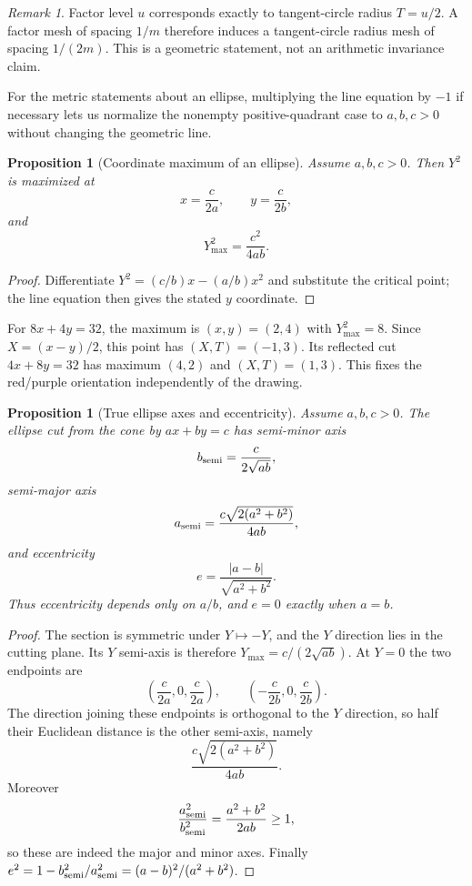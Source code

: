 \documentclass[11pt]{amsart}
\newtheorem{proposition}[theorem]{Proposition}
\theoremstyle{remark}
\newtheorem*{remark}{Remark}
\begin{document}
\begin{remark}
Factor level $u$ corresponds exactly to tangent-circle radius $T=u/2$. A factor mesh of spacing $1/m$ therefore induces a tangent-circle radius mesh of spacing $1/(2m)$. This is a geometric statement, not an arithmetic invariance claim.
\end{remark}

For the metric statements about an ellipse, multiplying the line equation by $-1$ if necessary lets us normalize the nonempty positive-quadrant case to $a,b,c>0$ without changing the geometric line.

\begin{proposition}[Coordinate maximum of an ellipse]\label{prop:semiaxes}
Assume $a,b,c>0$. Then $Y^2$ is maximized at
\[
x=\frac{c}{2a},\qquad y=\frac{c}{2b},
\]
and
\[
Y_{\max}^2=\frac{c^2}{4ab}.
\]
\end{proposition}
\begin{proof}
Differentiate $Y^2=(c/b)x-(a/b)x^2$ and substitute the critical point; the line equation then gives the stated $y$ coordinate.
\end{proof}

For $8x+4y=32$, the maximum is $(x,y)=(2,4)$ with $Y^2_{\max}=8$. Since $X=(x-y)/2$, this point has $(X,T)=(-1,3)$. Its reflected cut $4x+8y=32$ has maximum $(4,2)$ and $(X,T)=(1,3)$. This fixes the red/purple orientation independently of the drawing.

\begin{proposition}[True ellipse axes and eccentricity]\label{prop:trueaxes}
Assume $a,b,c>0$. The ellipse cut from the cone by $ax+by=c$ has semi-minor axis
\[
b_{\rm semi}=\frac{c}{2\sqrt{ab}},
\]
semi-major axis
\[
a_{\rm semi}=\frac{c\sqrt{2(a^2+b^2)}}{4ab},
\]
and eccentricity
\[
e=\frac{|a-b|}{\sqrt{a^2+b^2}}.
\]
Thus eccentricity depends only on $a/b$, and $e=0$ exactly when $a=b$.
\end{proposition}
\begin{proof}
The section is symmetric under $Y\mapsto-Y$, and the $Y$ direction lies in the cutting plane. Its $Y$ semi-axis is therefore $Y_{\max}=c/(2\sqrt{ab})$. At $Y=0$ the two endpoints are
\[
\left(\frac{c}{2a},0,\frac{c}{2a}\right),\qquad
\left(-\frac{c}{2b},0,\frac{c}{2b}\right).
\]
The direction joining these endpoints is orthogonal to the $Y$ direction, so half their Euclidean distance is the other semi-axis, namely
\[
\frac{c\sqrt{2(a^2+b^2)}}{4ab}.
\]
Moreover
\[
\frac{a_{\rm semi}^2}{b_{\rm semi}^2}=\frac{a^2+b^2}{2ab}\ge1,
\]
so these are indeed the major and minor axes. Finally $e^2=1-b_{\rm semi}^2/a_{\rm semi}^2=(a-b)^2/(a^2+b^2)$.
\end{proof}
\end{document}
